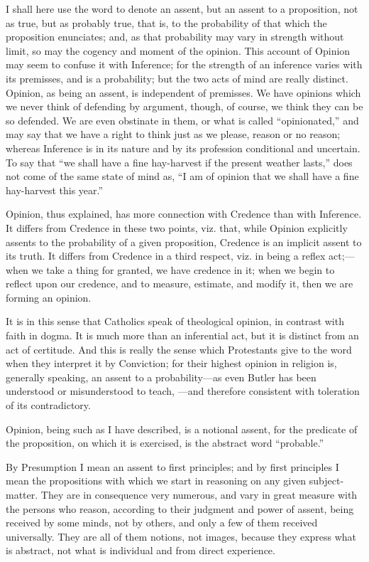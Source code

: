 I shall here use the word to denote an assent, but an assent to a
proposition, not as true, but as probably true, that is, to the
probability of that which the proposition enunciates; and, as that
probability may vary in strength without limit, so may the cogency and
moment of the opinion. This account of Opinion may seem to confuse it
with Inference; for the strength of an inference varies with its
premisses, and is a probability; but the two acts of mind are really
distinct. Opinion, as being an assent, is independent of premisses. We
have opinions which we never think of defending by argument, though,
of course, we think they can be so defended. We are even obstinate in
them, or what is called ``opinionated,'' and may say that we
have a right to think just as we please, reason or no reason; whereas
Inference is in its nature and by its profession conditional and
uncertain. To say that ``we shall have a fine hay-harvest if the
present weather lasts,'' does not come of the same state of mind
as, ``I am of opinion that we shall have a fine hay-harvest this
year.''

Opinion, thus explained, has more connection with Credence than
with Inference. It differs from Credence in these two points, viz.
that, while Opinion explicitly assents to the probability of a given
proposition, Credence is an implicit assent to its truth. It differs
from Credence in a third respect, viz. in being a reflex act;—when
we take a thing for granted, we have credence in it; when we begin to
reflect upon our credence, and to measure, estimate, and modify it,
then we are forming an opinion.

It is in this sense that Catholics speak of theological opinion, in
contrast with faith in dogma. It is much more than an inferential act,
but it is distinct from an act of certitude. And this is really the
sense which Protestants give to the word when they interpret it by
Conviction; for their highest opinion in religion is, generally
speaking, an assent to a probability—as even Butler has been
understood or misunderstood to teach, —and therefore consistent
with toleration of its contradictory.

Opinion, being such as I have described, is a notional assent, for
the predicate of the proposition, on which it is exercised, is the
abstract word ``probable.''


By Presumption I mean an assent to first principles; and by first
principles I mean the propositions with which we start in reasoning on
any given subject-matter. They are in consequence very numerous, and
vary in great measure with the persons who reason, according to their
judgment and power of assent, being received by some minds, not by
others, and only a few of them received universally. They are all of
them notions, not images, because they express what is abstract, not
what is individual and from direct experience.

